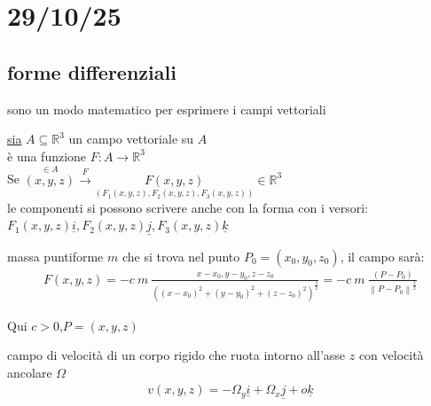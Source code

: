 \documentclass[a4paper, oneside]{article}
\begin{document}
\newpage
\section{29/10/25}
\subsection{forme differenziali}
sono un modo matematico per esprimere i campi vettoriali
\begin{definition}
    \underline{sia} $A \subseteq \mathbb{R}^3$ un campo vettoriale su $A$\\
    è una funzione $F:A \to \mathbb{R}^3$\\
    Se $\overset{\in A}{(x,y,z)} \overset{F}{\to} \underset{(F_1(x,y,z),F_2(x,y,z),F_3(x,y,z))}{F(x,y,z)} \in \mathbb{R}^3$\\
    le componenti si possono scrivere anche con la forma con i versori: $F_1(x,y,z)\underline{i},F_2(x,y,z)\underline{j},F_3(x,y,z)\underline{k}$
\end{definition}
\begin{example}
    massa puntiforme $m$ che si trova nel punto $P_0=(x_0,y_0,z_0)$, il campo sarà:
    \begin{gather*}
        F(x,y,z) = -c \ m \ \frac{x-x_0,y-y_0,z-z_0}{((x-x_0)^2+(y-y_0)^2+(z-z_0)^2)^{\frac{3}{2}}} = -c \ m \ \frac{(P-P_0)}{\left\lVert P-P_0 \right\rVert^\frac{3}{2} }
    \end{gather*}
    \begin{center}
    \end{center}
    Qui $c>0$,$P=(x,y,z)$
\end{example}
\begin{example}
    campo di velocità di un corpo rigido che ruota intorno all'asse $z$ con velocità ancolare $\Omega$
    \begin{gather*}
        v(x,y,z) = -\Omega_y \underline{i} + \Omega_x \underline{j} + o\underline{k}
    \end{gather*}
    \begin{center}
    \end{center}
\end{example}
\end{document}
